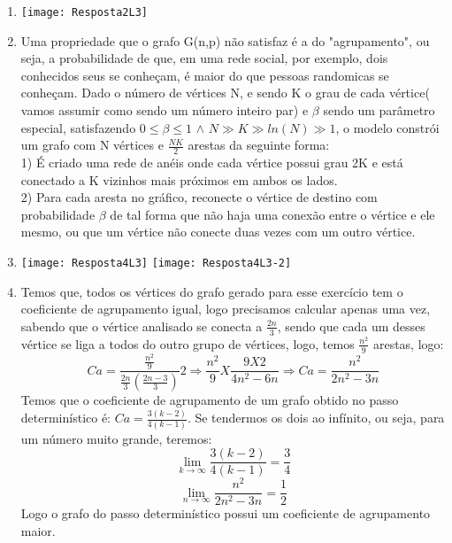 \documentclass[11pt,reqno]{amsart}
\begin{document}
\begin{enumerate}
		\vspace{0.3cm}

		\item
		\begin{minipage}{\linewidth}
		\centering
		\texttt{[image: Resposta2L3]}
		\end{minipage}
		
		\vspace{0.3cm}

		\item Uma propriedade que o grafo G(n,p) não satisfaz é a do "agrupamento", ou seja, a 
		probabilidade de que, em uma rede social, por exemplo, dois conhecidos seus se conheçam, é maior do 
		que pessoas randomicas se conheçam. Dado o número de vértices N, e sendo K o grau de cada vértice( 
		vamos assumir como sendo um número inteiro par) e $\beta$ sendo um parâmetro especial, satisfazendo
		$0 \leq \beta \leq 1$  $\wedge$  $N \gg K \gg ln(N) \gg 1 $, o modelo constrói um grafo com N 
		vértices e $\frac{NK}{2}$ arestas da seguinte forma: \\ 1) É criado uma rede de anéis onde cada 
		vértice possui grau 2K e está conectado a K vizinhos mais próximos em ambos os lados. \\ 2) Para
		cada aresta no gráfico, reconecte o vértice de destino com probabilidade $\beta$ de tal forma que 
		não haja uma conexão entre o vértice e ele mesmo, ou que um vértice não conecte duas vezes com um 
		outro vértice. 

		\vspace{0.3cm}

		\item 
		\begin{minipage}{\linewidth}
		\centering
		\texttt{[image: Resposta4L3]}
		\texttt{[image: Resposta4L3-2]}
		\end{minipage}

		\vspace{0.3cm}

		\item Temos que, todos os vértices do grafo gerado para esse exercício tem o coeficiente de 
		agrupamento igual, logo precisamos calcular apenas uma vez, sabendo que o vértice analisado se 
		conecta a $\frac{2n}{3}$, sendo que cada um desses vértice se liga a todos do outro grupo de 
		vértices, logo, temos $\frac{n^2}{9}$ arestas, logo: \[ C\textit{a} = \frac{\frac{n^2}{9}}{\frac{2n}
		{3}(\frac{2n-3}{3})}{2} \Rightarrow \frac{n^2}{9} X \frac{9X2}{4n^2-6n} \Rightarrow C\textit{a} = 
		\frac{n^2}{2n^2-3n} \] Temos que o coeficiente de agrupamento de um grafo obtido no passo 
		determinístico é: $C\textit{a} = \frac{3(k-2)}{4(k-1)}$. Se tendermos os dois ao 
		infínito, ou seja, para um número muito grande, teremos: \[\lim_{k\to\infty} \frac{3(k-2)}{4(k-1)} =
		 \frac{3}{4}\] \[\lim_{n\to\infty} \frac{n^2}{2n^2-3n} = \frac{1}{2}\] Logo o grafo do passo 
		 determinístico possui um coeficiente de agrupamento maior.


\end{enumerate}
\end{document}
